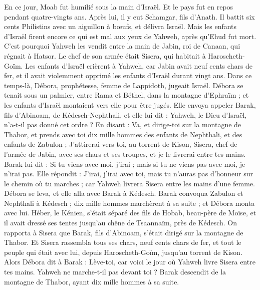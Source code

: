 \begin{multicols}{2}
En ce jour, Moab fut humilié sous la main d'Israël. Et le pays fut en repos pendant quatre-vingts ans.
Après lui, il y eut Schamgar, fils d'Anath. Il battit six cents Philistins avec un aiguillon à bœufs, et délivra Israël.
\VerseOne{}Mais les enfants d'Israël firent encore ce qui est mal aux yeux de Yahweh, après qu'Ehud fut mort.
C'est pourquoi Yahweh les vendit entre la main de Jabin, roi de Canaan, qui régnait à Hatsor. Le chef de son armée était Sisera, qui habitait à Haroscheth-Goïm.
Les enfants d'Israël crièrent à Yahweh, car Jabin avait neuf cents chars de fer, et il avait violemment opprimé les enfants d'Israël durant vingt ans.
Dans ce temps-là, Débora, prophétesse, femme de Lappidoth, jugeait Israël.
Débora se tenait sous un palmier, entre Rama et Béthel, dans la montagne d'Ephraïm ; et les enfants d'Israël montaient vers elle pour être jugés.
Elle envoya appeler Barak, fils d'Abinoam, de Kédesch-Nephthali, et elle lui dit : Yahweh, le Dieu d'Israël, n'a-t-il pas donné cet ordre ? En disant : Va, et dirige-toi sur la montagne de Thabor, et prends avec toi dix mille hommes des enfants de Nephthali, et des enfants de Zabulon ;
J’attirerai vers toi, au torrent de Kison, Sisera, chef de l'armée de Jabin, avec ses chars et ses troupes, et je le livrerai entre tes mains.
Barak lui dit : Si tu viens avec moi, j'irai ; mais si tu ne viens pas avec moi, je n’irai pas.
Elle répondit : J'irai, j'irai avec toi, mais tu n'auras pas d'honneur sur le chemin où tu marches ; car Yahweh livrera Sisera entre les mains d'une femme. Débora se leva, et elle alla avec Barak à Kédesch.
Barak convoqua Zabulon et Nephthali à Kédesch ; dix mille hommes marchèrent à sa suite ; et Débora monta avec lui.
Héber, le Kénien, s’était séparé des fils de Hobab, beau-père de Moïse, et il avait dressé ses tentes jusqu'au chêne de Tsaannaïm, près de Kédesch.
On rapporta à Sisera que Barak, fils d'Abinoam, s’était dirigé sur la montagne de Thabor.
Et Sisera rassembla tous ses chars, neuf cents chars de fer, et tout le peuple qui était avec lui, depuis Haroscheth-Goïm, jusqu'au torrent de Kison.
Alors Débora dit à Barak : Lève-toi, car voici le jour où Yahweh livre Sisera entre tes mains. Yahweh ne marche-t-il pas devant toi ? Barak descendit de la montagne de Thabor, ayant dix mille hommes à sa suite.

\end{multicols}
